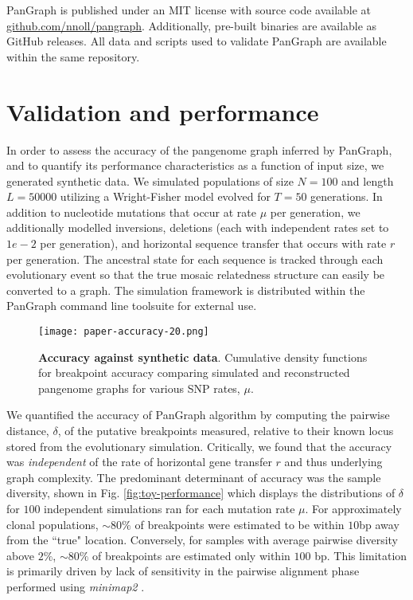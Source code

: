 \documentclass[aps,rmp,reprint,superscriptaddress,notitlepage,10pt]{revtex4-1}
\begin{document}
PanGraph is published under an MIT license with source code available at \url{github.com/nnoll/pangraph}.
Additionally, pre-built binaries are available as GitHub releases.
All data and scripts used to validate PanGraph are available within the same repository.

\section{Validation and performance}
In order to assess the accuracy of the pangenome graph inferred by PanGraph, and to quantify its performance 
characteristics as a function of input size, we generated synthetic data.
We simulated populations of size $N=100$ and length $L=50000$ utilizing a Wright-Fisher model evolved for $T=50$ generations.
In addition to nucleotide mutations that occur at rate $\mu$ per generation, we additionally modelled inversions, deletions (each with independent rates set to $1e-2$ per generation), and horizontal sequence transfer that occurs with rate $r$ per generation.
The ancestral state for each sequence is tracked through each evolutionary event so that the true mosaic relatedness structure can easily be converted to a graph.
The simulation framework is distributed within the PanGraph command line toolsuite for external use.

\begin{figure}[htb]
    \texttt{[image: paper-accuracy-20.png]}
    \caption{{\bf Accuracy against synthetic data}. Cumulative density functions for breakpoint accuracy comparing simulated and reconstructed pangenome graphs for various SNP rates, $\mu$.}
    \label{fig:toy-accuracy}
\end{figure}

We quantified the accuracy of PanGraph algorithm by computing the pairwise distance, $\delta$, of the putative breakpoints measured, relative to their known locus stored from the evolutionary simulation.
Critically, we found that the accuracy was \emph{independent} of the rate of horizontal gene transfer $r$ and thus underlying graph complexity.
The predominant determinant of accuracy was the sample diversity, shown in Fig. \ref{fig:toy-performance} which displays the distributions of $\delta$ for $100$ independent simulations ran for each mutation rate $\mu$.
For approximately clonal populations, $\sim 80\%$ of breakpoints were estimated to be within $10$bp away from the ``true" location.
Conversely, for samples with average pairwise diversity above $2\%$, $\sim 80\%$ of breakpoints are estimated only within $100$ bp.
This limitation is primarily driven by lack of sensitivity in the pairwise alignment phase performed using \emph{minimap2} \cite{li2018minimap2}.
\end{document}
